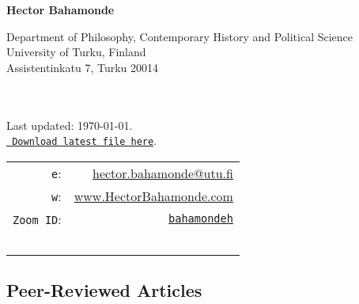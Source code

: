 \documentclass[letterpaper]{article}
\def\name{Hector Bahamonde}
\begin{document}
\centerline{\huge \bf \name}

\vspace{0.25in}

\begin{minipage}{0.45\linewidth}
 Department of Philosophy, Contemporary History and Political Science\\
 University of Turku, Finland\\
 Assistentinkatu 7, Turku 20014\\
  \\
  \\
\begin{footnotesize}
Last updated: \today. \\
\href{http://github.com/hbahamonde/Job_Market/raw/master/Bahamonde_List_of_Publications.pdf}{\texttt{{\color{red} Download latest file here}}}.%
\end{footnotesize}

\end{minipage}
 \hspace{\fill}\begin{minipage}{0.35\linewidth}
  \begin{tabular}{rr}
    \texttt{e}: & \href{mailto:hector.bahamonde@utu.fi}{hector.bahamonde@utu.fi} \\
    \texttt{w}: & \href{http://www.hectorbahamonde.com}{www.HectorBahamonde.com}\\
    \texttt{Zoom ID}: & \href{https://utu.zoom.us/my/bahamondeh}{\texttt{bahamondeh}}\\
    \\
    \\
    \\
    \\
    \\
  \end{tabular}
\end{minipage}




\subsection*{Peer-Reviewed Articles}
\end{document}
